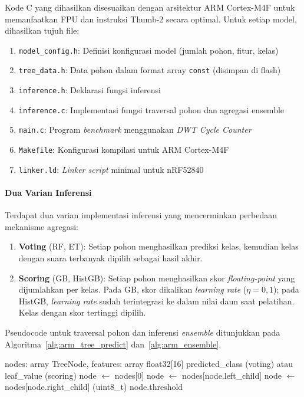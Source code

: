 Kode C yang dihasilkan disesuaikan dengan arsitektur ARM Cortex-M4F untuk memanfaatkan FPU dan instruksi Thumb-2 secara optimal. Untuk setiap model, dihasilkan tujuh file:

\begin{enumerate}
    \item \texttt{model\_config.h}: Definisi konfigurasi model (jumlah pohon, fitur, kelas)
    \item \texttt{tree\_data.h}: Data pohon dalam format array \texttt{const} (disimpan di flash)
    \item \texttt{inference.h}: Deklarasi fungsi inferensi
    \item \texttt{inference.c}: Implementasi fungsi traversal pohon dan agregasi ensemble
    \item \texttt{main.c}: Program \textit{benchmark} menggunakan \textit{DWT Cycle Counter}
    \item \texttt{Makefile}: Konfigurasi kompilasi untuk ARM Cortex-M4F
    \item \texttt{linker.ld}: \textit{Linker script} minimal untuk nRF52840
\end{enumerate}

\paragraph{Dua Varian Inferensi}
Terdapat dua varian implementasi inferensi yang mencerminkan perbedaan mekanisme agregasi:

\begin{enumerate}
    \item \textbf{Voting} (RF, ET): Setiap pohon menghasilkan prediksi kelas, kemudian kelas dengan suara terbanyak dipilih sebagai hasil akhir.
    \item \textbf{Scoring} (GB, HistGB): Setiap pohon menghasilkan skor \textit{floating-point} yang dijumlahkan per kelas. Pada GB, skor dikalikan \textit{learning rate} ($\eta = 0{,}1$); pada HistGB, \textit{learning rate} sudah terintegrasi ke dalam nilai daun saat pelatihan. Kelas dengan skor tertinggi dipilih.
\end{enumerate}

Pseudocode untuk traversal pohon dan inferensi \textit{ensemble} ditunjukkan pada Algoritma~\ref{alg:arm_tree_predict} dan~\ref{alg:arm_ensemble}.

\begin{algorithm}[htbp]
\caption{Traversal Pohon Keputusan Float32 pada ARM Cortex-M4F}
\label{alg:arm_tree_predict}
\begin{algorithmic}[1]
\REQUIRE nodes: array TreeNode, features: array float32[16]
\ENSURE predicted\_class (voting) atau leaf\_value (scoring)
\STATE node $\leftarrow$ nodes[0]
        \STATE node $\leftarrow$ nodes[node.left\_child] 
    \ELSE
        \STATE node $\leftarrow$ nodes[node.right\_child]
    \ENDIF
\ENDWHILE
\RETURN (uint8\_t) node.threshold 
\end{algorithmic}
\end{algorithm}

